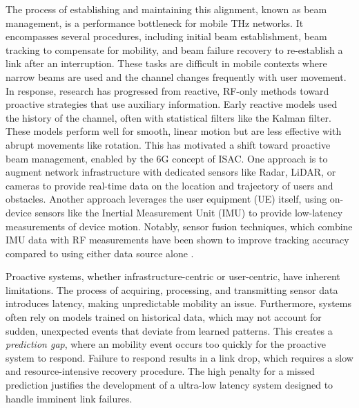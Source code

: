 \documentclass[fleqn,10pt]{wlscirep}
\begin{document}
The process of establishing and maintaining this alignment, known as beam management, is a performance bottleneck for mobile THz networks. It encompasses several procedures, including initial beam establishment, beam tracking to compensate for mobility, and beam failure recovery to re-establish a link after an interruption\cite{Giordani2018ATO, 10422712, Wang2022}. These tasks are difficult in mobile contexts where narrow beams are used and the channel changes frequently with user movement\cite{9536953, smartcities8040105}. In response, research has progressed from reactive, RF-only methods toward proactive strategies that use auxiliary information. Early reactive models used the history of the channel, often with statistical filters like the Kalman filter\cite{8455289,9145366,10067030, 10123123}. These models perform well for smooth, linear motion but are less effective with abrupt movements like rotation\cite{Wang2022}. This has motivated a shift toward proactive beam management, enabled by the 6G concept of ISAC\cite{10494372, Azari2022, Nokia2022, Chen2023, Jornet2023}. One approach is to augment network infrastructure with dedicated sensors like Radar, LiDAR, or cameras to provide real-time data on the location and trajectory of users and obstacles\cite{10422712,5GPPP_Automotive_Vision_2015}. Another approach leverages the user equipment (UE) itself, using on-device sensors like the Inertial Measurement Unit (IMU) to provide low-latency measurements of device motion. Notably, sensor fusion techniques, which combine IMU data with RF measurements have been shown to improve tracking accuracy compared to using either data source alone \cite{10036372,9391649,electronics8020142, s21082723, 9814507}.

Proactive systems, whether infrastructure-centric or user-centric, have inherent limitations. The process of acquiring, processing, and transmitting sensor data introduces latency, making unpredictable mobility an issue\cite{9838772}. Furthermore, systems often rely on models trained on historical data, which may not account for sudden, unexpected events that deviate from learned patterns. This creates a \emph{prediction gap}, where an mobility event occurs too quickly for the proactive system to respond\cite{10036372}. Failure to respond results in a link drop, which requires a slow and resource-intensive recovery procedure. The high penalty for a missed prediction justifies the development of a ultra-low latency system designed to handle imminent link failures.
\end{document}

